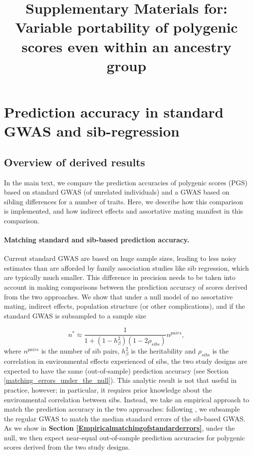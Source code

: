 \documentclass[hidelinks, 12pt]{article}
\title{Supplementary Materials for: Variable portability of polygenic scores even within an ancestry group}
\newcommand{\beginsupplement}{%
    \setcounter{table}{0}
    \renewcommand{\thetable}{S\arabic{table}}%
    \setcounter{figure}{0}
    \renewcommand{\thefigure}{S\arabic{figure}}%
}
\begin{document}
 
\baselineskip24pt

\maketitle 
\begin{center}
\end{center}
\clearpage

\begingroup
  \hypersetup{hidelinks}
  \tableofcontents
\endgroup

\listoffigures
\listoftables

\pagebreak

\beginsupplement

\section{Prediction accuracy in standard GWAS and sib-regression}
\subsection{Overview of derived results}
In the main text, we compare the prediction accuracies of polygenic scores (PGS) based on standard GWAS (of unrelated individuals) and a GWAS based on sibling differences for a number of traits. Here, we describe how this comparison is implemented, and how indirect effects and assortative mating manifest in this comparison.   

\paragraph{Matching standard and sib-based prediction accuracy.} Current standard GWAS are based on huge sample sizes, leading to less noisy estimates than are afforded by family association studies like sib regression, which are typically much smaller.  This difference in precision needs to be taken into account in making comparisons between the prediction accuracy of scores derived from the two approaches.  We show that under a null model of no assortative mating, indirect effects, population structure (or other complications), and if the standard GWAS is subsampled to a sample size 

$$n^* \approx \frac{1}{1+(1-h_{\beta}^2)(1-2\rho_{sibs})}n^{pairs},$$
where $n^{pairs}$ is the number of sib pairs, $h_{\beta}^2$ is the heritability and $\rho_{sibs}$ is the correlation in environmental effects experienced of sibs, the two study designs are expected to have the same (out-of-sample) prediction accuracy (see Section \ref{matching_errors_under_the_null}).  This analytic result is not that useful in practice, however; in particular, it requires prior knowledge about the environmental correlation between sibs.  Instead, we take an empirical approach to match the prediction accuracy in the two approaches: following  \cite{wood2014defining}, we subsample the regular GWAS to match the median standard errors of the sib-based GWAS.  As we show in {\bf Section \ref{Empiricalmatchingofstandarderrors}}, under the null, we then expect near-equal out-of-sample prediction accuracies for polygenic scores derived from the two study designs.  
\end{document}
